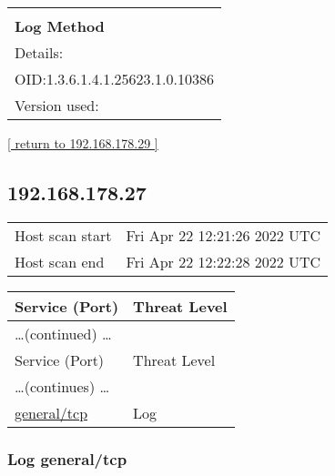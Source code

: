 \documentclass{article}
\begin{document}
\begin{longtable}{|p{}|}
        \hline
        \\
\textbf{Log Method}\\
Details:
\rowcolor{white}{\verb=Response Time / No 404 Error Code Check=}\\
OID:1.3.6.1.4.1.25623.1.0.10386\\
Version used:
\rowcolor{white}{\verb=2020-11-27T13:32:50Z=}\\
\end{longtable}

\begin{footnotesize}\hyperref[host:192.168.178.29]{[ return to 192.168.178.29 ]}\end{footnotesize}
\subsection{192.168.178.27}
\label{host:192.168.178.27}

\begin{tabular}{ll}
Host scan start&Fri Apr 22 12:21:26 2022 UTC\\
Host scan end&Fri Apr 22 12:22:28 2022 UTC\\
\end{tabular}

\begin{longtable}{|l|l|}
\hline
\rowcolor{gvm_report}Service (Port)&Threat Level\\
\hline
\endfirsthead
\multicolumn{2}{l}{\hfill\ldots (continued) \ldots}\\
\hline
\rowcolor{gvm_report}Service (Port)&Threat Level\\
\hline
\endhead
\hline
\multicolumn{2}{l}{\ldots (continues) \ldots}\\
\endfoot
\hline
\endlastfoot
\hline
\hyperref[port:192.168.178.27 general/tcp Log]{general/tcp}&Log\\
\hline
\end{longtable}



\subsubsection{Log general/tcp}
\label{port:192.168.178.27 general/tcp Log}
\end{document}
